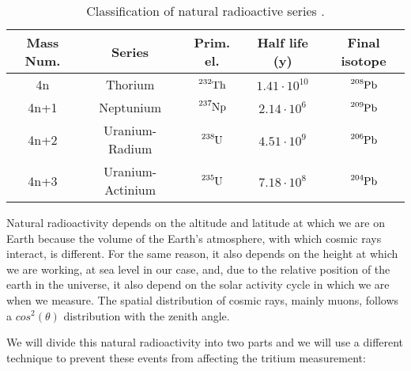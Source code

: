 \begin{table}[htbp]
\begin{center}
\begin{tabular}{|c|c|c|c|c|}
\hline
Mass Num. & Series & Prim. el. & Half life (y) & Final isotope \\
\hline \hline \hline
4n & Thorium & $\ce{^{232}Th}$ & $1.41 \cdot{} 10^{10}$ & $\ce{^{208}Pb}$ \\ \hline
4n+1 & Neptunium & $\ce{^{237}Np}$ & $2.14 \cdot{} 10^{6}$ & $\ce{^{209}Pb}$ \\ \hline
4n+2 & Uranium-Radium & $\ce{^{238}U}$ & $4.51 \cdot{} 10^{9}$ & $\ce{^{206}Pb}$ \\ \hline
4n+3 & Uranium-Actinium & $\ce{^{235}U}$ & $7.18 \cdot{} 10^{8}$ & $\ce{^{204}Pb}$ \\ \hline
\end{tabular}
\caption{Classification of natural radioactive series \cite{NaturalRadioactiveSeries1}\cite{NaturalRadioactiveSeries2}.}
\label{tab:NaturalRadioactiveSeries}
\end{center}
\end{table}

Natural radioactivity depends on the altitude and latitude at which we are on Earth because the volume of the Earth's atmosphere, with which cosmic rays interact, is different. For the same reason, it also depends on the height at which we are working, at sea level in our case, and, due to the relative position of the earth in the universe, it also depend on the solar activity cycle in which we are when we measure. The spatial distribution of cosmic rays, mainly muons, follows a $cos^2(\theta)$ distribution with the zenith angle. %

We will divide this natural radioactivity into two parts and we will use a different technique to prevent these events from affecting the tritium measurement:

